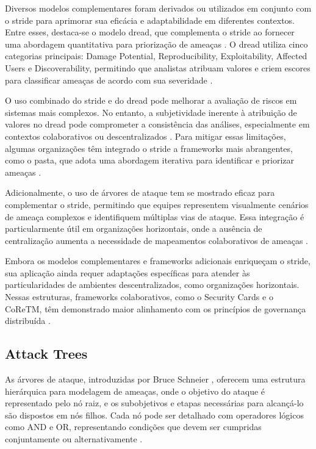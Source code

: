 Diversos modelos complementares foram derivados ou utilizados em
conjunto com o \gls{stride} para aprimorar sua eficácia e adaptabilidade em
diferentes contextos. Entre esses, destaca-se o modelo \gls{dread}, que
complementa o \gls{stride} ao fornecer uma abordagem quantitativa para
priorização de ameaças \cite{DREADful}. O \gls{dread} utiliza cinco
categorias principais: Damage Potential, Reproducibility,
Exploitability, Affected Users e Discoverability, permitindo que
analistas atribuam valores e criem escores para classificar ameaças de
acordo com sua severidade
\cite{SoftwareandattackcentricThreatModeling}.

O uso combinado do \gls{stride} e do \gls{dread} pode melhorar a avaliação de
riscos em sistemas mais complexos. No entanto, a subjetividade
inerente à atribuição de valores no \gls{dread} pode comprometer a
consistência das análises, especialmente em contextos colaborativos ou
descentralizados \cite{DREADful}. Para mitigar essas limitações,
algumas organizações têm integrado o \gls{stride} a frameworks mais
abrangentes, como o \gls{pasta}, que adota uma abordagem iterativa para identificar e
priorizar ameaças \cite{SoftwareandattackcentricThreatModeling}.

Adicionalmente, o uso de árvores de ataque tem se mostrado eficaz para
complementar o \gls{stride}, permitindo que equipes representem visualmente
cenários de ameaça complexos e identifiquem múltiplas vias de ataque.
Essa integração é particularmente útil em organizações horizontais,
onde a ausência de centralização aumenta a necessidade de mapeamentos
colaborativos de ameaças \cite{ThreatModelingdesigningForSecurity}.

Embora os modelos complementares e frameworks adicionais enriqueçam o
\gls{stride}, sua aplicação ainda requer adaptações específicas para atender
às particularidades de ambientes descentralizados, como organizações
horizontais. Nessas estruturas, frameworks colaborativos, como o
Security Cards e o CoReTM, têm demonstrado maior alinhamento com os
princípios de governança distribuída
\cite{SoftwareandattackcentricThreatModeling}.

\subsection{Attack Trees}
\label{subsec:attack_trees}

As árvores de ataque, introduzidas por Bruce Schneier
\cite{AttackTrees}, oferecem uma estrutura hierárquica para modelagem
de ameaças, onde o objetivo do ataque é representado pelo nó raiz, e
os subobjetivos e etapas necessárias para alcançá-lo são dispostos em
nós filhos. Cada nó pode ser detalhado com operadores lógicos como AND
e OR, representando condições que devem ser cumpridas conjuntamente ou
alternativamente \cite{FoundationsofAttackTrees}.

